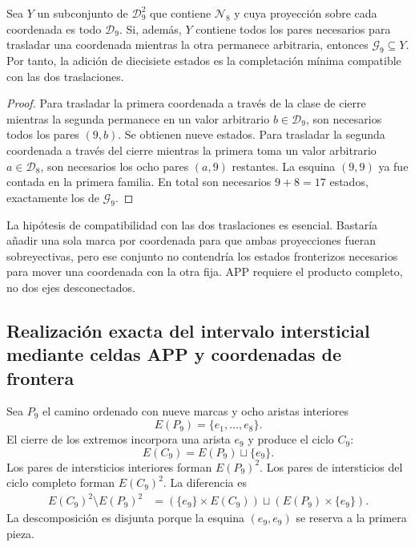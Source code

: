 \begin{proposition}
\label{p12-83-c1-s2:prop:app-minimalidad-completacion}
Sea \(Y\) un subconjunto de \(\mathcal D_9^2\) que contiene
\(\mathcal N_8\) y cuya proyección sobre cada coordenada es todo
\(\mathcal D_9\). Si, además, \(Y\) contiene todos los pares necesarios
para trasladar una coordenada mientras la otra permanece arbitraria,
entonces \(\mathcal G_9\subseteq Y\). Por tanto, la adición de diecisiete
estados es la completación mínima compatible con las dos traslaciones.
\end{proposition}

\begin{proof}
Para trasladar la primera coordenada a través de la clase de cierre mientras
la segunda permanece en un valor arbitrario \(b\in\mathcal D_9\), son
necesarios todos los pares \((9,b)\). Se obtienen nueve estados. Para
trasladar la segunda coordenada a través del cierre mientras la primera toma
un valor arbitrario \(a\in\mathcal D_8\), son necesarios los ocho pares
\((a,9)\) restantes. La esquina \((9,9)\) ya fue contada en la primera
familia. En total son necesarios \(9+8=17\) estados, exactamente los de
\(\mathcal G_9\).
\end{proof}

La hipótesis de compatibilidad con las dos traslaciones es esencial. Bastaría
añadir una sola marca por coordenada para que ambas proyecciones fueran
sobreyectivas, pero ese conjunto no contendría los estados fronterizos
necesarios para mover una coordenada con la otra fija. APP requiere el
producto completo, no dos ejes desconectados.

\subsection{Realización exacta del intervalo intersticial mediante celdas APP y coordenadas de frontera}

Sea \(P_9\) el camino ordenado con nueve marcas y ocho aristas interiores
\[
 E(P_9)=\{e_1,\ldots,e_8\}.
\]
El cierre de los extremos incorpora una arista \(e_9\) y produce el ciclo
\(C_9\):
\[
 E(C_9)=E(P_9)\sqcup\{e_9\}.
\]
Los pares de intersticios interiores forman \(E(P_9)^2\). Los pares de
intersticios del ciclo completo forman \(E(C_9)^2\). La diferencia es
\begin{align}
 E(C_9)^2\setminus E(P_9)^2
   &=(\{e_9\}\times E(C_9))
     \sqcup(E(P_9)\times\{e_9\}).
\label{p12-83-c1-s2:eq:app-complemento-intersticial}
\end{align}
La descomposición es disjunta porque la esquina \((e_9,e_9)\) se reserva a
la primera pieza.

